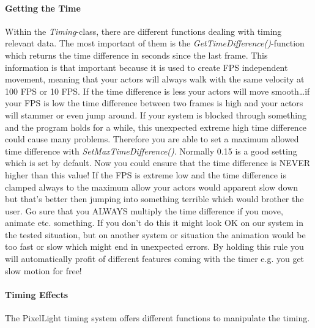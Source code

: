 \paragraph{Getting the Time}
Within the \emph{Timing}-class, there are different functions dealing with timing relevant data. The most important of them is the \emph{GetTimeDifference()}-function which returns the time difference in seconds since the last frame. This information is that important because it is used to create FPS independent movement, meaning that your actors will always walk with the same velocity at 100 FPS or 10 FPS. If the time difference is less your actors will move smooth\ldots if your FPS is low the time difference between two frames is high and your actors will stammer or even jump around. If your system is blocked through something and the program holds for a while, this unexpected extreme high time difference could cause many problems. Therefore you are able to set a maximum allowed time difference with \emph{SetMaxTimeDifference()}. Normally 0.15 is a good setting which is set by default. Now you could ensure that the time difference is NEVER higher than this value! If the FPS is extreme low and the time difference is clamped always to the maximum allow your actors would apparent slow down but that's better then jumping into something terrible which would brother the user. Go sure that you ALWAYS multiply the time difference if you move, animate etc. something. If you don't do this it might look OK on our system in the tested situation, but on another system or situation the animation would be too fast or slow which might end in unexpected errors. By holding this rule you will automatically profit of different features coming with the timer e.g. you get slow motion for free!


\paragraph{Timing Effects}
The PixelLight timing system offers different functions to manipulate the timing.

